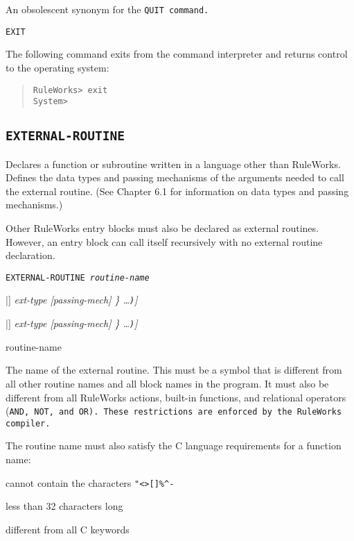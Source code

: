 An obsolescent synonym for the \tt{QUIT} command.

\Format

\tt{EXIT}

\Example

The following command exits from the command interpreter and returns
control to the operating system:

\begin{quote}
\begin{verbatim}
RuleWorks> exit
System>
\end{verbatim}
\end{quote}

\subsection{\tt{EXTERNAL-ROUTINE}}

Declares a function or subroutine written in a language other than
RuleWorks. Defines the data types and passing mechanisms of the
arguments needed to call the external routine. (See Chapter 6.1 for
information on data types and passing mechanisms.)

Other RuleWorks entry blocks must also be declared as external
routines. However, an entry block can call itself recursively with no
external routine declaration.

\Format

\tt{EXTERNAL-ROUTINE} \it{routine-name}


\qquad[\tt{(ACCEPTS} \{ [\verb|<|\it{f-param-name}\verb|>|
[\verb|[|\it{size}\verb|]|] \it{ext-type} [\it{passing-mech}]
\} \ldots\verb|)|]

\qquad[\tt{(RETURNS} \{ [\verb|<|\it{f-param-name}\verb|>|
[\verb|[|\it{size}\verb|]|] \it{ext-type} [\it{passing-mech}]
\} \ldots\verb|)|]

\begin{arguments}
\item[routine-name]

  The name of the external routine. This must be a symbol that is
  different from all other routine names and all block names in the
  program. It must also be different from all RuleWorks actions,
  built-in functions, and relational operators (\tt{AND}, \tt{NOT},
  and \tt{OR}). These restrictions are enforced by the RuleWorks
  compiler.

  The routine name must also satisfy the C language requirements for a
  function name:

  \qquad cannot contain the characters \verb|"<>[]%^-|

  \qquad less than 32 characters long

  \qquad different from all C keywords
\end{arguments}

